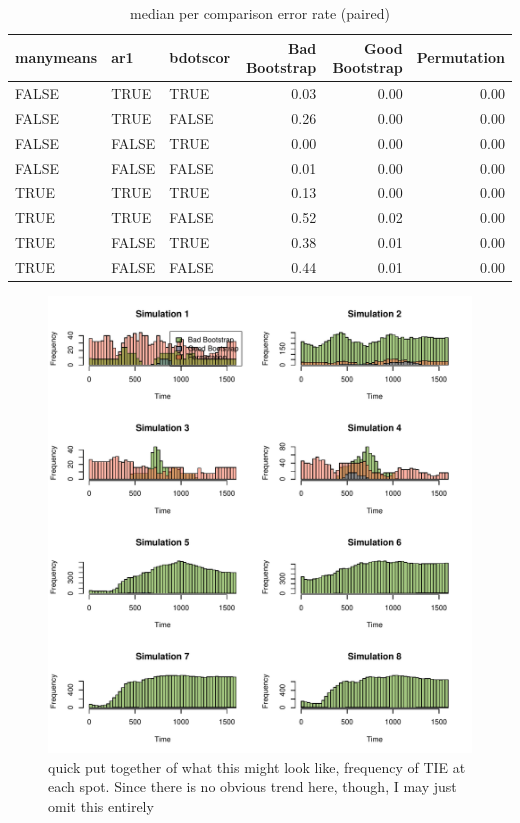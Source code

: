 \documentclass{article}
\begin{document}
\begin{table}[H]
\centering
\begin{tabular}{lllrrr}
  \hline
  manymeans & ar1 & bdotscor &  Bad Bootstrap & Good Bootstrap & Permutation  \\ 
  \hline
FALSE & TRUE & TRUE & 0.03 & 0.00 & 0.00 \\ 
  FALSE & TRUE & FALSE & 0.26 & 0.00 & 0.00 \\ 
  FALSE & FALSE & TRUE & 0.00 & 0.00 & 0.00 \\ 
  FALSE & FALSE & FALSE & 0.01 & 0.00 & 0.00 \\ 
  TRUE & TRUE & TRUE & 0.13 & 0.00 & 0.00 \\ 
  TRUE & TRUE & FALSE & 0.52 & 0.02 & 0.00 \\ 
  TRUE & FALSE & TRUE & 0.38 & 0.01 & 0.00 \\ 
  TRUE & FALSE & FALSE & 0.44 & 0.01 & 0.00 \\ 
   \hline
\end{tabular}
\caption{median per comparison error rate (paired)}
\end{table}

\begin{figure}[H]
\centering
\includegraphics{TEMP_histogram.pdf}
\caption{quick put together of what this might look like, frequency of TIE at each spot. Since there is no obvious trend here, though, I may just omit this entirely}
\end{figure}
\end{document}
